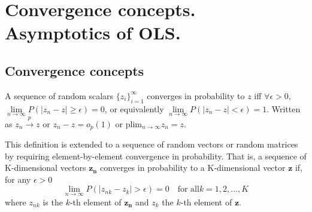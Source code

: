 \documentclass[DIV=14,titlepage=false]{scrreprt}
\begin{document}
\vspace{-10pt}
\setcounter{chapter}{5}
\chapter{Convergence concepts. Asymptotics of OLS.}
\vspace{-10pt}
\section{Convergence concepts}
\begin{definition}
    A sequence of random scalars $\{ z_i \}_{i=1}^{\infty}$ converges in probability to $z$ iff $\forall \epsilon>$0, $\underset{ n \to \infty}{\lim} P(|z_n-z|\geq\epsilon)=0$, or equivalently $\underset{ n \to \infty}{\lim} P(|z_n-z|<\epsilon)=1.$ Written as $z_n \overset{p}{\to}z$ or $z_n-z = o_p(1)$ or plim$_{ n \to \infty}z_n=z$.
\end{definition}

This definition is extended to a sequence of random vectors or random matrices by requiring element-by-element convergence in probability. That is, a sequence of K-dimensional vectors {$\mathbf{z_n}$} converges in probability to a K-dimensional vector $\mathbf{z}$ if, for any $\epsilon>0$ \[\underset{ n \to \infty}{\lim} P(|z_{nk}-z_k|>\epsilon)=0 \quad \text{for all} k=1,2,...,K \] where $z_{nk}$ is the $k$-th element of $\mathbf{z_n}$ and $z_k$ the $k$-th element of $\mathbf{z}$.
\end{document}
